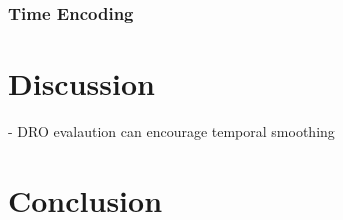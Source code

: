 \documentclass[runningheads]{llncs}
\begin{document}
\subsubsection{Time Encoding}



\section{Discussion}

- DRO evalaution can encourage temporal smoothing

\section{Conclusion}

%
%
%


\end{document}
